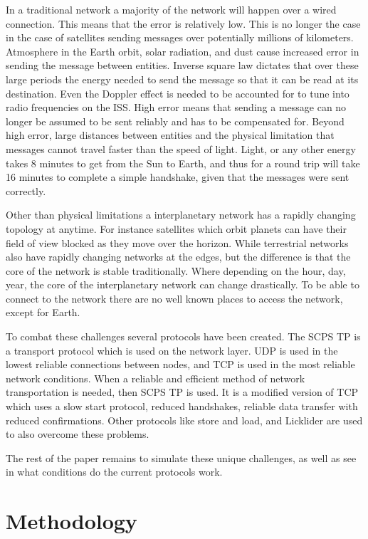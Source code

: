 \documentclass[a4paper,12pt]{article}
\begin{document}
In a traditional network a majority of the network will happen over a wired
connection. This means that the error is relatively low. This is no longer the
case in the case of satellites sending messages over potentially millions of
kilometers. Atmosphere in the Earth orbit, solar radiation, and dust cause
increased error in sending the message between entities. Inverse square law
dictates that over these large periods the energy needed to send the message so
that it can be read at its destination. Even the Doppler effect is needed to be
accounted for to tune into radio frequencies on the ISS. High error means that
sending a message can no longer be assumed to be sent reliably and has to be
compensated for. Beyond high error, large distances between entities and the
physical limitation that messages cannot travel faster than the speed of light.
Light, or any other energy takes 8 minutes to get from the Sun to Earth, and
thus for a round trip will take 16 minutes to complete a simple handshake, given
that the messages were sent correctly.

Other than physical limitations a interplanetary network has a rapidly changing
topology at anytime. For instance satellites which orbit planets can have their
field of view blocked as they move over the horizon. While terrestrial networks
also have rapidly changing networks at the edges, but the difference is that the
core of the network is stable traditionally. Where depending on the hour, day,
year, the core of the interplanetary network can change drastically. To be able
to connect to the network there are no well known places to access the network,
except for Earth.

To combat these challenges several protocols have been created. The SCPS TP is a
transport protocol which is used on the network layer. UDP is used in the lowest
reliable connections between nodes, and TCP is used in the most reliable network
conditions. When a reliable and efficient method of network transportation is
needed, then SCPS TP is used. It is a modified version of TCP which uses a slow
start protocol, reduced handshakes, reliable data transfer with reduced
confirmations. Other protocols like store and load, and Licklider are used to
also overcome these problems.

The rest of the paper remains to simulate these unique challenges, as well as
see in what conditions do the current protocols work.

\section{Methodology}
\end{document}
